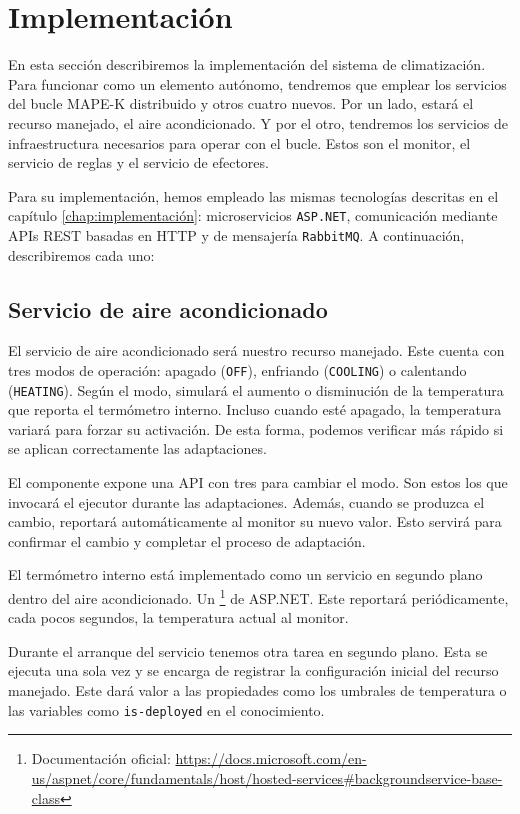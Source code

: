 \section{Implementación}

En esta sección describiremos la implementación del sistema de climatización. Para funcionar como un elemento autónomo, tendremos que emplear los servicios del bucle MAPE-K distribuido y otros cuatro nuevos. Por un lado, estará el recurso manejado, el aire acondicionado. Y por el otro, tendremos los servicios de infraestructura necesarios para operar con el bucle. Estos son el monitor, el servicio de reglas y el servicio de efectores.

Para su implementación, hemos empleado las mismas tecnologías descritas en el capítulo \ref{chap:implementación}: microservicios \texttt{ASP.NET}, comunicación mediante APIs REST basadas en HTTP y  de mensajería \texttt{RabbitMQ}. A continuación, describiremos cada uno:

\subsection{Servicio de aire acondicionado}

El servicio de aire acondicionado será nuestro recurso manejado. Este cuenta con tres modos de operación: apagado (\texttt{OFF}), enfriando (\texttt{COOLING}) o calentando (\texttt{HEATING}). Según el modo, simulará el aumento o disminución de la temperatura que reporta el termómetro interno. Incluso cuando esté apagado, la temperatura variará para forzar su activación. De esta forma, podemos verificar más rápido si se aplican correctamente las adaptaciones.

El componente expone una API con tres  para cambiar el modo. Son estos los que invocará el ejecutor durante las adaptaciones. Además, cuando se produzca el cambio, reportará automáticamente al monitor su nuevo valor. Esto servirá para confirmar el cambio y completar el proceso de adaptación.

El termómetro interno está implementado como un servicio en segundo plano dentro del aire acondicionado. Un \footnote{Documentación oficial: \url{https://docs.microsoft.com/en-us/aspnet/core/fundamentals/host/hosted-services\#backgroundservice-base-class}} de ASP.NET. Este reportará periódicamente, cada pocos segundos, la temperatura actual al monitor.

Durante el arranque del servicio tenemos otra tarea en segundo plano. Esta se ejecuta una sola vez y se encarga de registrar la configuración inicial del recurso manejado. Este dará valor a las propiedades como los umbrales de temperatura o las variables como \texttt{is-deployed} en el conocimiento.

